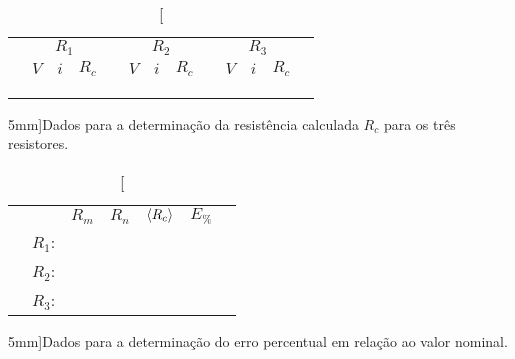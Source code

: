 \begin{table*}[!ht]
\centering
\begin{tabular}{lp{13mm}p{13mm}p{13mm}cp{13mm}p{13mm}p{13mm}cp{13mm}p{13mm}p{13mm}l}
\toprule
    & \multicolumn{3}{c}{$R_1$} & & \multicolumn{3}{c}{$R_2$} & & \multicolumn{3}{c}{$R_3$} \\
    \cmidrule{2-4} \cmidrule{6-8} \cmidrule{10-12}
    & $V$ & $i$ & $R_c$ & & $V$ & $i$ & $R_c$ & & $V$ & $i$ & $R_c$ \\
    \cmidrule{2-4} \cmidrule{6-8} \cmidrule{10-12}
    & \cellcolor[gray]{0.89} & \cellcolor[gray]{0.92} & \cellcolor[gray]{0.89} && \cellcolor[gray]{0.89} & \cellcolor[gray]{0.92} & \cellcolor[gray]{0.89} && \cellcolor[gray]{0.89} & \cellcolor[gray]{0.92} & \cellcolor[gray]{0.89} & \\
    & \cellcolor[gray]{0.95} & \cellcolor[gray]{0.97} & \cellcolor[gray]{0.95} && \cellcolor[gray]{0.95} & \cellcolor[gray]{0.97} & \cellcolor[gray]{0.95} && \cellcolor[gray]{0.95} & \cellcolor[gray]{0.97} & \cellcolor[gray]{0.95}  \\
    & \cellcolor[gray]{0.89} & \cellcolor[gray]{0.92} & \cellcolor[gray]{0.89} && \cellcolor[gray]{0.89} & \cellcolor[gray]{0.92} & \cellcolor[gray]{0.89} && \cellcolor[gray]{0.89} & \cellcolor[gray]{0.92} & \cellcolor[gray]{0.89} & \\
\bottomrule
\end{tabular}
\caption[][5mm]{Dados para a determinação da resistência calculada $R_c$ para os três resistores.}
\label{Tab:MedidasResistencia1}
\end{table*}

\vspace{3cm}

\begin{table}[!ht]
\centering
\begin{tabular}{lp{13mm}p{13mm}p{13mm}p{13mm}p{13mm}l}
\toprule
    && $R_m$ & $R_n$ & $\left\langle{R_c}\right\rangle$ & $E_{\%}$ \\
    \cmidrule{2-6}
    & $R_1$: \cellcolor[gray]{0.89} & \cellcolor[gray]{0.92} & \cellcolor[gray]{0.89} & \cellcolor[gray]{0.92} & \cellcolor[gray]{0.89} & \\
    & $R_2$: \cellcolor[gray]{0.95} & \cellcolor[gray]{0.97} & \cellcolor[gray]{0.95} & \cellcolor[gray]{0.97} & \cellcolor[gray]{0.95} \\
    & $R_3$: \cellcolor[gray]{0.89} & \cellcolor[gray]{0.92} & \cellcolor[gray]{0.89} & \cellcolor[gray]{0.92} & \cellcolor[gray]{0.89} \\
\bottomrule
\end{tabular}
\caption[][5mm]{Dados para a determinação do erro percentual em relação ao valor nominal.}
\label{Tab:MedidasResistencia2}
\end{table}
